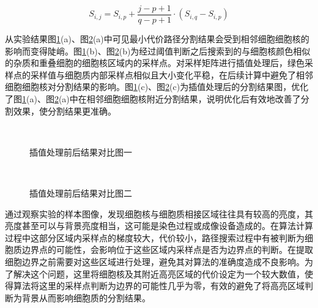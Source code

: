 \documentclass[nomlist,masters]{seuthesix}
\begin{document}
\begin{equation}
S_{i,j}=S_{i,p}+\frac{j-p+1}{q-p+1}\cdot \left ( S_{i,q}-S_{i,p} \right )
\label{insert}
\end{equation}

从实验结果图\ref{inserta}(a)、图\ref{insertb}(a)中可见最小代价路径分割结果会受到相邻细胞细胞核的影响而变得陡峭。图\ref{inserta}(b)、图\ref{insertb}(b)为经过阈值判断之后搜索到的与细胞核颜色相似的杂质和重叠细胞的细胞核区域内的采样点。对采样矩阵进行插值处理后，绿色采样点的采样值与细胞质内部采样点相似且大小变化平稳，在后续计算中避免了相邻细胞细胞核对分割结果的影响。图\ref{inserta}(c)、图\ref{insertb}(c)为插值处理后的分割结果图，优化了图\ref{inserta}(a)、图\ref{insertb}(a)中在相邻细胞细胞核附近分割结果，说明优化后有效地改善了分割效果，使分割结果更准确。

\begin{figure}[H]
\centering 
\hspace{0.01\textwidth}
\hspace{0.01\textwidth}
\caption{插值处理前后结果对比图一}
\label{inserta}
\end{figure}

\begin{figure}[H]
\centering 
\hspace{0.01\textwidth}
\hspace{0.01\textwidth}
\caption{插值处理前后结果对比图二}
\label{insertb}
\end{figure}



通过观察实验的样本图像，发现细胞核与细胞质相接区域往往具有较高的亮度，其亮度甚至可以与背景亮度相当，这可能是染色过程或成像设备造成的。在算法计算过程中这部分区域内采样点的梯度较大，代价较小，路径搜索过程中有被判断为细胞质边界点的可能性，会影响位于这些区域内采样点是否为边界点的判断。在提取细胞边界之前需要对这些区域进行处理，避免其对算法的准确度造成不良影响。为了解决这个问题，这里将细胞核及其附近高亮区域的代价设定为一个较大数值，使得算法将这里的采样点判断为边界的可能性几乎为零，有效的避免了将高亮区域判断为背景从而影响细胞质的分割结果。
\end{document}
